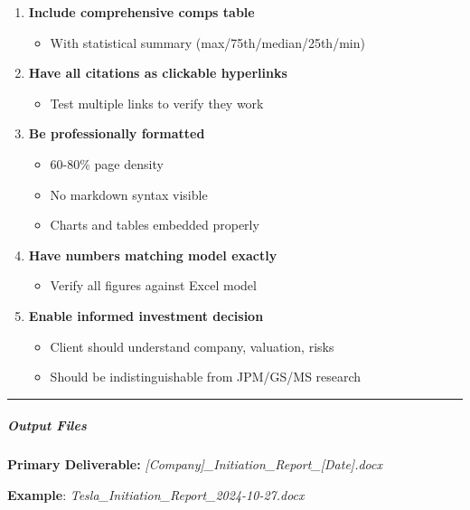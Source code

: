 \documentclass[11pt]{article}
\begin{document}
\begin{enumerate}[leftmargin=*,itemsep=2pt,topsep=2pt]
\begin{itemize}[leftmargin=*,itemsep=2pt,topsep=2pt]
\end{itemize}
\item {} \textbf{Include comprehensive comps table}
\begin{itemize}[leftmargin=*,itemsep=2pt,topsep=2pt]
\item {} With statistical summary (max/75th/median/25th/min)
\end{itemize}
\item {} \textbf{Have all citations as clickable hyperlinks}
\begin{itemize}[leftmargin=*,itemsep=2pt,topsep=2pt]
\item {} Test multiple links to verify they work
\end{itemize}
\item {} \textbf{Be professionally formatted}
\begin{itemize}[leftmargin=*,itemsep=2pt,topsep=2pt]
\item {} 60-80\% page density
\item {} No markdown syntax visible
\item {} Charts and tables embedded properly
\end{itemize}
\item {} \textbf{Have numbers matching model exactly}
\begin{itemize}[leftmargin=*,itemsep=2pt,topsep=2pt]
\item {} Verify all figures against Excel model
\end{itemize}
\item {} \textbf{Enable informed investment decision}
\begin{itemize}[leftmargin=*,itemsep=2pt,topsep=2pt]
\item {} Client should understand company, valuation, risks
\item {} Should be indistinguishable from JPM/GS/MS research
\end{itemize}
\end{enumerate}

\vspace{0.5em}\hrule\vspace{0.5em}

\subparagraph{Output Files}\mbox{}\par

\textbf{Primary Deliverable:} \emph{[Company]\_\allowbreak{}Initiation\_\allowbreak{}Report\_\allowbreak{}[Date].docx}


\textbf{Example}: \emph{Tesla\_\allowbreak{}Initiation\_\allowbreak{}Report\_\allowbreak{}2024-10-27.docx}
\end{document}
